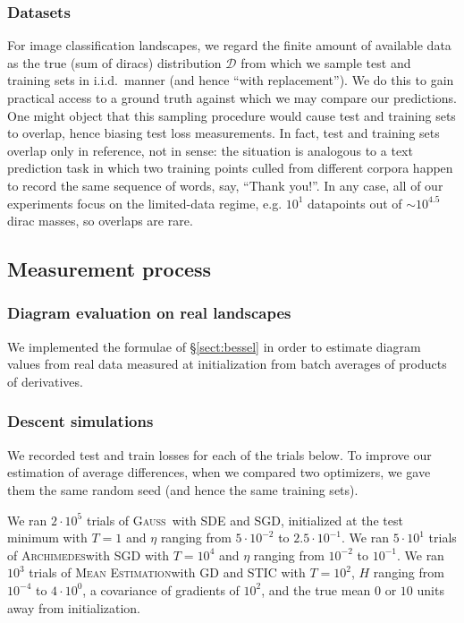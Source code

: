 \documentclass{article}
\theoremstyle{plain}
\theoremstyle{definition}
\newcommand{\Dd}{\mathcal{D}}
\newcommand{\Gauss}{\textsc{Gauss}}
\newcommand{\Archimedes}{\textsc{Archimedes}}
\newcommand{\MeanEstimation}{\textsc{Mean Estimation}}
\begin{document}
        \subsubsection*{Datasets}
            For image classification landscapes, we regard the finite amount of
            available data as the true (sum of diracs) distribution $\Dd$ from
            which we sample test and training sets in i.i.d.\ manner (and hence
            ``with replacement'').  We do this to gain practical access to a
            ground truth against which we may compare our predictions.  One
            might object that this sampling procedure would cause test and
            training sets to overlap, hence biasing test loss measurements.  In
            fact, test and training sets overlap only in reference, not in
            sense: the situation is analogous to a text prediction task in
            which two training points culled from different corpora happen to
            record the same sequence of words, say, ``Thank you!''.  In any
            case, all of our experiments focus on the limited-data regime, e.g.
            $10^1$ datapoints out of $\sim 10^{4.5}$ dirac masses, so overlaps
            are rare.

    \subsection{Measurement process}                                \label{appendix:measure}

        \subsubsection*{Diagram evaluation on real landscapes}
            We implemented the formulae of \S\ref{sect:bessel} in order
            to estimate diagram values from real data measured at
            initialization from batch averages of products of derivatives.

        \subsubsection*{Descent simulations}
            We recorded test and train losses for each of the trials below.  To
            improve our estimation of average differences, when we compared two
            optimizers, we gave them the same random seed (and hence the same
            training sets).

            We ran $2 \cdot 10^5$ trials of \Gauss\, with SDE and SGD,
            initialized at the test minimum with $T=1$ and $\eta$ ranging from
            $5\cdot 10^{-2}$ to $2.5\cdot 10^{-1}$.
            We ran $5 \cdot 10^1$ trials of \Archimedes with SGD with $T=10^4$
            and $\eta$ ranging from $10^{-2}$ to $10^{-1}$.
            We ran $10^3$ trials of \MeanEstimation with GD and STIC
            with $T=10^2$, $H$ ranging from $10^{-4}$ to $4 \cdot 10^0$,
            a covariance of gradients of $10^2$, and the true mean $0$ or
            $10$ units away from initialization.
\end{document}
